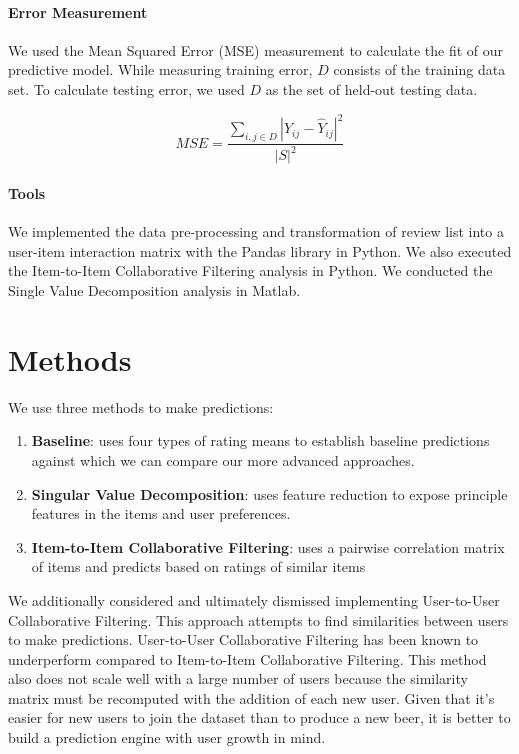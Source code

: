 \documentclass[12pt]{article}
\begin{document}
\paragraph{Error Measurement}
We used the Mean Squared Error (MSE) measurement to calculate the fit of our predictive model. While measuring training error, $D$ consists of the training data set. To calculate testing error, we used $D$ as the set of held-out testing data.

$$ {MSE} = \frac{\sum\limits_{i,j \in D} {{|Y_{ij} - \hat{Y}_{ij}|}}^2}{{{|S|}}^2} $$

\paragraph{Tools}
We implemented the data pre-processing and transformation of review list into a user-item interaction matrix with the Pandas library in Python. We also executed the Item-to-Item Collaborative Filtering analysis in Python. We conducted the Single Value Decomposition analysis in Matlab.

\section{Methods}
We use three methods to make predictions:

\begin{enumerate}
  \item \textbf{Baseline}: uses four types of rating means to establish baseline predictions against which we can compare our more advanced approaches.
  \item \textbf{Singular Value Decomposition}: uses feature reduction to expose principle features in the items and user preferences.
  \item \textbf{Item-to-Item Collaborative Filtering}: uses a pairwise correlation matrix of items and predicts based on ratings of similar items
\end{enumerate}

We additionally considered and ultimately dismissed implementing User-to-User Collaborative Filtering. This approach attempts to find similarities between users to make predictions. User-to-User Collaborative Filtering has been known to underperform compared to Item-to-Item Collaborative Filtering.\textsuperscript{\cite{sarwar}} This method also does not scale well with a large number of users because the similarity matrix must be recomputed with the addition of each new user. Given that it's easier for new users to join the dataset than to produce a new beer, it is better to build a prediction engine with user growth in mind.\textsuperscript{\cite{linden}}
\end{document}
